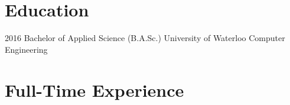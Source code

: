 \documentclass[print]{friggeri-cv} %
\begin{document}

\section{Education}

\begin{entrylist}


\entry
{2016}
{}
{Bachelor of Applied Science (B.A.Sc.)}
{University of Waterloo}
{Computer Engineering}


\end{entrylist}


\section{Full-Time Experience}
\end{document}
